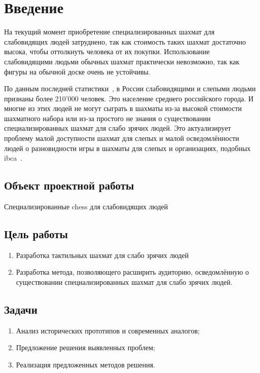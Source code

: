 \section{Введение}
На текущий момент приобретение специализированных шахмат для слабовидящих людей
затруднено, так как стоимость таких шахмат достаточно высока, чтобы оттолкнуть
человека от их покупки. Использование слабовидящими людьми обычных шахмат
практически невозможно, так как фигуры на обычной доске очень не устойчивы. 

По данным последней статистики~\cite{web:min-educ}, в России слабовидящими и
слепыми людьми признаны более 210'000 человек. Это население среднего
российского города. И многие из этих людей не могут сыграть в шахматы из-за
высокой стоимости шахматного набора или из-за простого не знания о существовании
специализированных шахмат для слабо зрячих людей. Это актуализирует проблему
малой доступности шахмат для слепых и малой осведомлённости людей о разновидности игры в
шахматы для слепых и организациях, подобных \acrshort{ibca}~\cite{web:wiki-ibca}.\@

\subsection*{Объект проектной работы}
Специализированные \gls{chess} для слабовидящих людей

\subsection*{Цель работы}
\begin{enumerate}
    \item Разработка тактильных шахмат для слабо зрячих людей
    \item Разработка метода, позволяющего расширить аудиторию, осведомлённую о
        существовании специализированных шахмат для слабо зрячих людей.
\end{enumerate}

\subsection*{Задачи}
\begin{enumerate}
    \item Анализ исторических прототипов и современных аналогов;
    \item Предложение решения выявленных проблем;
    \item Реализация предложенных методов решения.
\end{enumerate}

